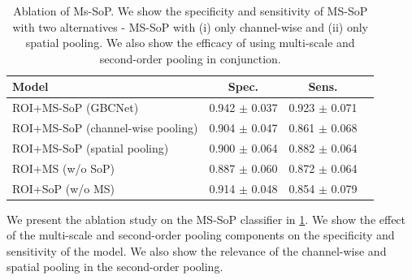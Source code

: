 \begin{table}[t]
	\centering
	\footnotesize
    \begin{tabular}{@{}lccc@{}}
    \toprule[1pt]
    \textbf{Model} & \textbf{Spec.} & \textbf{Sens.} \\
    \midrule[0.5pt]
    ROI+MS-SoP (GBCNet) & 0.942 $\pm$ 0.037 & 0.923 $\pm$ 0.071 \\
    ROI+MS-SoP (channel-wise pooling) & 0.904 $\pm$ 0.047 & 0.861 $\pm$ 0.068  \\
    ROI+MS-SoP (spatial pooling) & 0.900 $\pm$ 0.064 & 0.882 $\pm$ 0.064 \\
    ROI+MS (w/o SoP) & 0.887 $\pm$ 0.060 & 0.872 $\pm$ 0.064 \\
    ROI+SoP (w/o MS) & 0.914 $\pm$ 0.048 & 0.854 $\pm$ 0.079 \\
    \bottomrule[1pt]
    \end{tabular}
	\caption[Ablation of the proposed MS-SoP network]{Ablation of Ms-SoP. We show the specificity and sensitivity of MS-SoP with two alternatives - MS-SoP with (i) only channel-wise and (ii) only spatial pooling. We also show the efficacy of using multi-scale and second-order pooling in conjunction.}
\label{tbl:ms-sop-ablation}
\end{table}

%
We present the ablation study on the MS-SoP classifier in \cref{tbl:ms-sop-ablation}. We show the effect of the multi-scale and second-order pooling components on the specificity and sensitivity of the model. We also show the relevance of the channel-wise and spatial pooling in the second-order pooling.